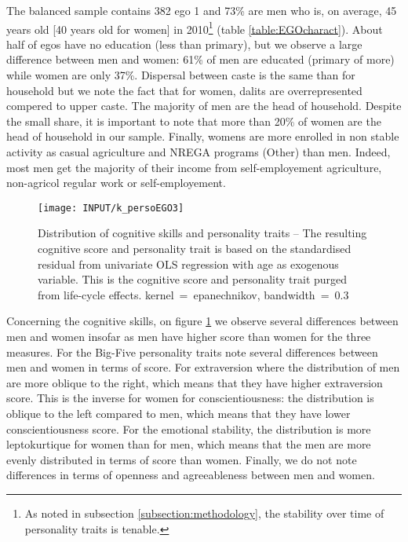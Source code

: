 \documentclass[a4paper, 11pt, onecolumn]{article}
\begin{document}

The balanced sample contains 382 ego 1 and 73\% are men who is, on average, 45 years old [40 years old for women] in 2010\footnote{As noted in subsection \ref{subsection:methodology}, the stability over time of personality traits is tenable.} (table \ref{table:EGOcharact}).
About half of egos have no education (less than primary), but we observe a large difference between men and women: 61\% of men are educated (primary of more) while women are only 37\%.
Dispersal between caste is the same than for household but we note the fact that for women, dalits are overrepresented compered to upper caste.
The majority of men are the head of household.%
Despite the small share, it is important to note that more than 20\% of women are the head of household in our sample.
Finally, womens are more enrolled in non stable activity as casual agriculture and NREGA programs (Other) than men.
Indeed, most men get the majority of their income from self-employement agriculture, non-agricol regular work or self-employement.

\begin{figure}[ht]
\raggedright
\texttt{[image: INPUT/k\_persoEGO3]}
\caption{Distribution of cognitive skills and personality traits -- The resulting cognitive score and personality trait is based on the standardised residual from univariate OLS regression with age as exogenous variable. This is the cognitive score and personality trait purged from life-cycle effects. kernel~=~epanechnikov, bandwidth~=~0.3}
\label{figure:EGOscore}
\end{figure}
Concerning the cognitive skills, on figure \ref{figure:EGOscore} we observe several differences between men and women insofar as men have higher score than women for the three measures.
 For the Big-Five personality traits note several differences between men and women in terms of score.
For extraversion where the distribution of men are more oblique to the right, which means that they have higher extraversion score.
This is the inverse for women for conscientiousness: the distribution is oblique to the left compared to men, which means that they have lower conscientiousness score.
For the emotional stability, the distribution is more leptokurtique for women than for men, which means that the men are more evenly distributed in terms of score than women.
Finally, we do not note differences in terms of openness and agreeableness between men and women.
\end{document}
